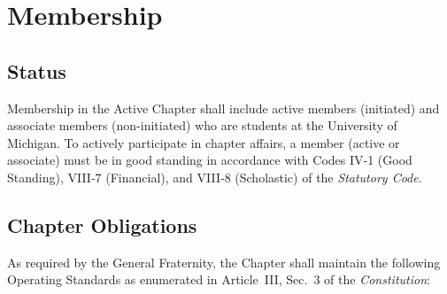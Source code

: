 \documentclass{article}
\begin{document}
\section{Membership}

\subsection{Status}

Membership in the Active Chapter shall include active members (initiated) and
associate members (non-initiated) who are students at the University of
Michigan. To actively participate in chapter affairs, a member (active or
associate) must be in good standing in accordance with Codes IV‑1 (Good
Standing), VIII‑7 (Financial), and VIII‑8 (Scholastic) of the \emph{Statutory
Code}.

\subsection{Chapter Obligations}

As required by the General Fraternity, the Chapter shall maintain the following
Operating Standards as enumerated in Article~III, Sec.~3 of the
\emph{Constitution}:
\end{document}

